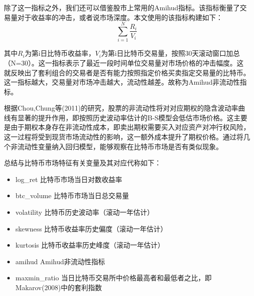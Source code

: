 {{}
\par{
    除了这一指标之外，我们还可以借鉴股市上常用的Amihud指标\cite{Yako-2002}。该指标衡量了交易量对于收益率的冲击，或者说市场深度。本文使用的该指标构建如下：
}
\begin{equation}
    \sum_{i=1}^{N}{\frac{R_i}{V_i}}
\end{equation}
\par{
    其中$R_i$为第i日比特币收益率，$V_i$为第i日比特币交易量，按照30天滚动窗口加总（N=30）。这一指标表示了最近一段时间单位交易量对市场价格的冲击幅度。这就反映出了套利组合的交易者是否有能力按照指定价格买卖指定交易量的比特币。这一指标越大，交易量对市场冲击越大，流动性越差。故称为Amihud非流动性指标。
}
\par{
    根据Chou,Chung等(2011)的研究，股票的非流动性将对对应期权的隐含波动率曲线有显著的提升作用\cite{doi:10.1002/fut.20531}，即按照历史波动率估计的B-S模型会低估市场价格。这主要是由于期权本身存在非流动性成本，即卖出期权需要买入对应资产对冲行权风险，这一过程将受到现货市场流动性的影响，这一额外成本提升了期权价格。通过将几个非流动性变量纳入回归模型，能够观察在比特币市场是否有类似现象。
}
\par{总结与比特币市场特征有关变量及其对应代称如下：}
\begin{itemize}
\item log\_ret 比特币市场当日对数收益率
\item btc\_volume 比特币市场当日总交易量
\item volatility 比特币历史波动率（滚动一年估计）
\item skewness 比特币收益率历史偏度（滚动一年估计）
\item kurtosis 比特币收益率历史峰度（滚动一年估计）
\item amihud Amihud非流动性指标
\item maxmin\_ratio 当日比特币交易所中价格最高者和最低者之比，即Makarov(2008)中的套利指数\cite{Makarov-2018}
\end{itemize}
}
